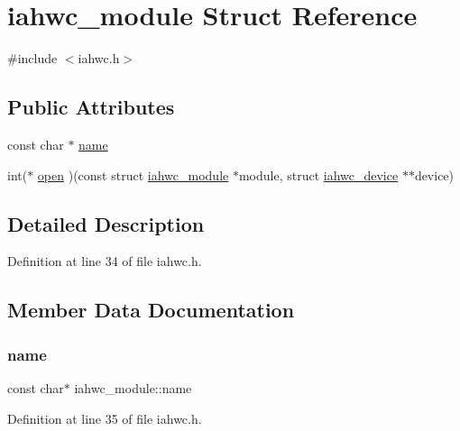 \hypertarget{structiahwc__module}{}\section{iahwc\+\_\+module Struct Reference}
\label{structiahwc__module}


{\ttfamily \#include $<$iahwc.\+h$>$}

\subsection*{Public Attributes}
\begin{DoxyCompactItemize}
\item 
const char $\ast$ \mbox{\hyperlink{structiahwc__module_a8aca00107399693835af2abd3d6a2af9}{name}}
\item 
int($\ast$ \mbox{\hyperlink{structiahwc__module_a4d021a5ef4c5cc54e58ce6aa84f81402}{open}} )(const struct \mbox{\hyperlink{structiahwc__module}{iahwc\+\_\+module}} $\ast$module, struct \mbox{\hyperlink{structiahwc__device}{iahwc\+\_\+device}} $\ast$$\ast$device)
\end{DoxyCompactItemize}


\subsection{Detailed Description}


Definition at line 34 of file iahwc.\+h.



\subsection{Member Data Documentation}
\mbox{\label{structiahwc__module_a8aca00107399693835af2abd3d6a2af9}} 
\subsubsection{\texorpdfstring{name}{name}}
{\footnotesize\ttfamily const char$\ast$ iahwc\+\_\+module\+::name}



Definition at line 35 of file iahwc.\+h.

\mbox{\label{structiahwc__module_a4d021a5ef4c5cc54e58ce6aa84f81402}} 
